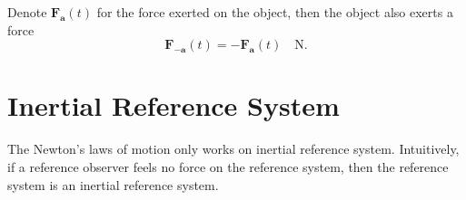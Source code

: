 Denote $\mathbf F_{\mathbf a}(t)$ for the force exerted on the object, then the object also exerts a force
\begin{equation}
	\mathbf F_{- \mathbf a}(t) = - \mathbf F_{\mathbf a}(t) \quad \mathrm{N}.
\end{equation}





\section{Inertial Reference System}


The Newton's laws of motion only works on inertial reference system. Intuitively, if a reference observer feels no force on the reference system, then the reference system is an inertial reference system.










































%
